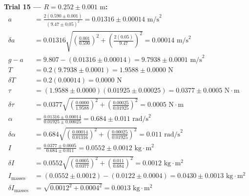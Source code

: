 \documentclass[11pt]{article}
\begin{document}
\textbf{Trial 15 — $R = 0.252 \pm 0.001\text{ m}$:}
\begin{align*}
a &= \frac{2(0.590 \pm 0.001)}{(9.47 \pm 0.05)^2} = 0.01316 \pm 0.00014\text{ m/s}^2 \\
\delta a &= 0.01316\sqrt{\left(\frac{0.001}{0.590}\right)^2 + \left(\frac{2(0.05)}{9.47}\right)^2} = 0.00014\text{ m/s}^2 \\
g - a &= 9.807 - (0.01316 \pm 0.00014) = 9.7938 \pm 0.0001\text{ m/s}^2 \\
T &= 0.2(9.7938 \pm 0.0001) = 1.9588 \pm 0.0000\text{ N} \\
\delta T &= 0.2(0.00014) = 0.0000\text{ N} \\
\tau &= (1.9588 \pm 0.0000)(0.01925 \pm 0.00025) = 0.0377 \pm 0.0005\text{ N}\cdot\text{m} \\
\delta\tau &= 0.0377\sqrt{\left(\frac{0.0000}{1.9588}\right)^2 + \left(\frac{0.00025}{0.01925}\right)^2} = 0.0005\text{ N}\cdot\text{m} \\
\alpha &= \frac{0.01316 \pm 0.00014}{0.01925 \pm 0.00025} = 0.684 \pm 0.011\text{ rad/s}^2 \\
\delta\alpha &= 0.684\sqrt{\left(\frac{0.00014}{0.01316}\right)^2 + \left(\frac{0.00025}{0.01925}\right)^2} = 0.011\text{ rad/s}^2 \\
I &= \frac{0.0377 \pm 0.0005}{0.684 \pm 0.011} = 0.0552 \pm 0.0012\text{ kg}\cdot\text{m}^2 \\
\delta I &= 0.0552\sqrt{\left(\frac{0.0005}{0.0377}\right)^2 + \left(\frac{0.011}{0.684}\right)^2} = 0.0012\text{ kg}\cdot\text{m}^2 \\
I_{\text{masses}} &= (0.0552 \pm 0.0012) - (0.0122 \pm 0.0004) = 0.0430 \pm 0.0013\text{ kg}\cdot\text{m}^2 \\
\delta I_{\text{masses}} &= \sqrt{0.0012^2 + 0.0004^2} = 0.0013\text{ kg}\cdot\text{m}^2
\end{align*}
\end{document}
